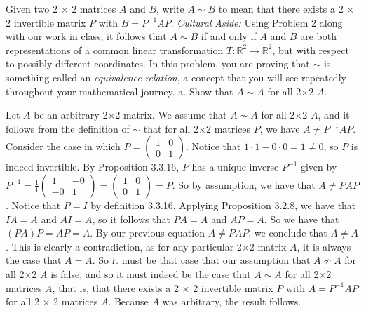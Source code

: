 \documentclass[12pt]{article}
\newenvironment{problem}[2][Problem]
{
	\begin{trivlist} 
		\item[\hskip \labelsep {\bfseries #1 #2:}]
	}
{
	\end{trivlist}
	}
\newenvironment{solution}[1][Solution]
{
	\begin{trivlist} 
		\item[\hskip \labelsep {\itshape #1:}]
	}
	{
	\end{trivlist}
}
\begin{document}
\newpage
\begin{problem}{3}
Given two 2 $\times$ 2 matrices $A$ and $B$, write $A \sim B$ to mean that there exists a 2 $\times$ 2 invertible matrix $P$ with $B=P^{-1}AP$.
\noindent
\newline
\newline
{\it Cultural} {\it Aside:} Using Problem 2 along with our work in class, it follows that $A\sim B$ if and only if $A$ and $B$ are both representations of a common linear transformation $T:\mathbb{R}^2 \to \mathbb{R}^2$, but with respect to possibly different coordinates. In this problem, you are proving that $\sim$ is something called an {\it equivalence} {\it relation}, a concept that you will see repeatedly throughout your mathematical journey.
\noindent
\newline
\newline
a. Show that $A\sim A$ for all 2$\times$2 $A$.
\begin{solution}
Let $A$ be an arbitrary 2$\times$2 matrix. We assume that $A \nsim A$ for all 2$\times$2 $A$, and it follows from the definition of $\sim$ that for all 2$\times$2 matrices $P$, we have $A \neq P^{-1} A P$. Consider the case in which $P = \begin{pmatrix}1&0\\0&1\end{pmatrix}$. Notice that $1\cdot 1 - 0\cdot 0 =1 \neq 0$, so $P$ is indeed invertible. By Proposition 3.3.16, $P$ has a unique inverse $P^{-1}$ given by $P^{-1} = \frac{1}{1} \begin{pmatrix} 1&-0\\-0&1\end{pmatrix} = \begin{pmatrix} 1&0\\0&1\end{pmatrix} =P $. So by assumption, we have that $A \neq P A P$. Notice that $P=I$ by definition 3.3.16. Applying Proposition 3.2.8, we have that $I A =A$ and $A I =A$, so it follows that $P A =A$ and $A P = A$. So we have that $(P A) P = A P = A$. By our previous equation $A \neq P A P$, we conclude that $A \neq A$. This is clearly a contradiction, as for any particular 2$\times$2 matrix $A$, it is always the case that $A=A$. So it must be that case that our assumption that  $A \nsim A$ for all 2$\times$2 $A$ is false, and so it must indeed be the case that $A\sim A$ for all 2$\times$2 matrices $A$, that is, that there exists a  2 $\times$ 2 invertible matrix $P$ with $A=P^{-1}AP$ for all 2 $\times$ 2 matrices $A$. Because $A$ was arbitrary, the result follows.

\end{solution}
\end{problem}
\end{document}
